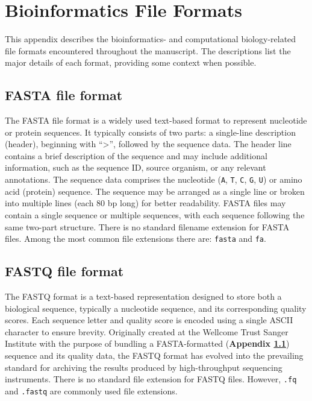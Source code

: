 \documentclass[a4paper, titlepage, openright]{book}
\begin{document}
\appendix
\chapter{Bioinformatics File Formats}\label{appendix:fileformats}
This appendix describes the bioinformatics- and computational biology-related file formats encountered throughout the manuscript. The descriptions list the major details of each format, providing some context when possible. 

\section{FASTA file format}\label{section:fasta-format}
The FASTA file format is a widely used text-based format to represent nucleotide or protein sequences. It typically consists of two parts: a single-line description (header), beginning with ``>'', followed by the sequence data. The header line contains a brief description of the sequence and
may include additional information, such as the sequence ID, source organism, or any relevant annotations. The sequence data comprises the nucleotide (\texttt{A}, \texttt{T}, \texttt{C}, \texttt{G}, \texttt{U}) or amino acid (protein) sequence. The sequence may be arranged as a single line or broken into multiple lines (each 80 bp long) for better readability. FASTA files may contain a single sequence or multiple sequences, with each sequence following the same two-part structure. There is no standard filename extension for FASTA files. Among the most common file extensions there are: \texttt{fasta} and \texttt{fa}.

\section{FASTQ file format}\label{section:fastq-format}
The FASTQ format is a text-based representation designed to store both a biological sequence, typically a nucleotide sequence, and its corresponding quality scores. Each sequence letter and quality score is encoded using a single ASCII character to ensure brevity. Originally created at the Wellcome Trust Sanger Institute with the purpose of bundling a FASTA-formatted (\textbf{Appendix \ref{section:fasta-format}}) sequence and its quality data, the FASTQ format has evolved into the prevailing standard for archiving the results produced by high-throughput sequencing instruments. There is no standard file extension for FASTQ files. However, \texttt{.fq} and \texttt{.fastq} are commonly used file extensions.
\end{document}
